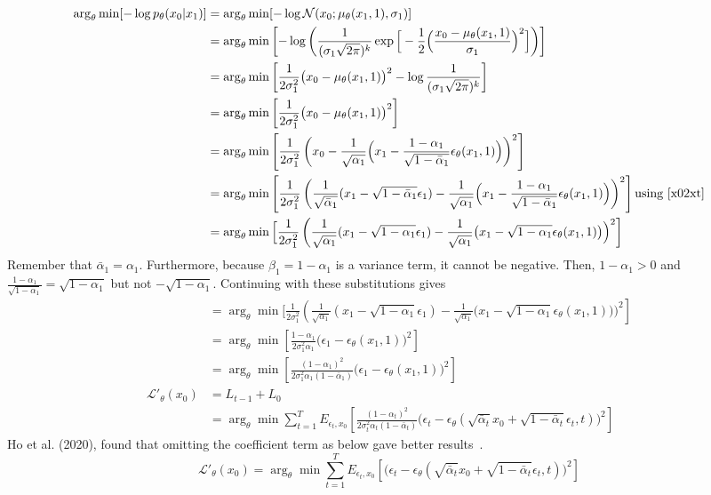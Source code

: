 \documentclass{article}
\numberwithin{equation}{subsection}
\begin{document}
\begin{align}
    \arg_\theta\min[-\log p_\theta(x_0 |x_1)] 
    &= \arg_\theta\min[-\log \mathcal{N}(x_0; \mu_\theta(x_1, 1), \sigma_1)]\\
    &= \arg_\theta\min\left[-\log \left(\frac {1}{(\sigma_1\sqrt{2\pi})^k} \exp\Big[-{\frac {1}{2}}\Big(\frac {x_0-\mu_\theta(x_1, 1)}{\sigma_1}\Big)^2\Big]\right)\right]\\
    &= \arg_\theta\min\left[{\frac {1}{2\sigma_1^2}}\big(x_0-\mu_\theta(x_1, 1)\big)^2-\log \frac {1}{(\sigma_1\sqrt{2\pi})^k}\right]\\
    &= \arg_\theta\min\left[{\frac {1}{2\sigma_1^2}}\big(x_0-\mu_\theta(x_1, 1)\big)^2\right]\\
    &= \arg_\theta\min\left[{\frac {1}{2\sigma_1^2}}\left(x_0-\frac{1}{\sqrt{\alpha_1}} \Big(x_1 - \frac{1 - \alpha_1}{\sqrt{1 - \bar{\alpha}_1}} \epsilon_\theta(x_1,1) \Big)\right)^2\right]\\
    &= \arg_\theta\min\left[{\frac {1}{2\sigma_1^2}}\left(\frac{1}{\sqrt{\bar{\alpha}_1}}(x_1 - \sqrt{1 - \bar{\alpha}_1}\epsilon_1)-\frac{1}{\sqrt{\alpha_1}} \Big(x_1 - \frac{1 - \alpha_1}{\sqrt{1 - \bar{\alpha}_1}} \epsilon_\theta(x_1,1) \Big)\right)^2\right]\text{using~\ref{x02xt}}\\
    &= \arg_\theta\min\Big[{\frac {1}{2\sigma_1^2}}\left(\frac{1}{\sqrt{\alpha_1}}(x_1 - \sqrt{1 - \alpha_1}\epsilon_1)-\frac{1}{\sqrt{\alpha_1}} \big(x_1 - \sqrt{1 - \alpha_1} \epsilon_\theta(x_1,1) \big)\Big)^2\right]
\end{align}
Remember that $\bar{\alpha}_1 = \alpha_1$. Furthermore, because $\beta_1 = 1-\alpha_1$ is a variance term, it cannot be negative. Then, $1-\alpha_1 > 0$ and $\frac{1-\alpha_1}{\sqrt{1-\alpha_1}} = \sqrt{1-\alpha_1}$ but not $-\sqrt{1-\alpha_1}$. Continuing with these substitutions gives
\begin{align}
    &= \arg_\theta\min\Big[{\frac {1}{2\sigma_1^2}}\left(\frac{1}{\sqrt{\alpha_1}}(x_1 - \sqrt{1 - \alpha_1}\epsilon_1)-\frac{1}{\sqrt{\alpha_1}} \big(x_1 - \sqrt{1 - \alpha_1} \epsilon_\theta(x_1,1) \big)\Big)^2\right]\\
    &= \arg_\theta\min\left[\frac{1-\alpha_1}{2\sigma_1^2\alpha_1}\big(\epsilon_1-\epsilon_\theta(x_1,1) \big)^2\right]\\
    &= \arg_\theta\min\left[\frac{(1-\alpha_1)^2}{2\sigma_1^2\alpha_1(1 - \bar{\alpha}_1)}\big(\epsilon_1-\epsilon_\theta(x_1,1) \big)^2\right]\\
    \mathcal{L'}_\theta(x_0) &= L_{t-1}+L_0\\
    &= \arg_\theta\min \sum_{t=1}^TE_{\epsilon_t, x_0}\left[\frac{(1-\alpha_t)^2}{2\sigma_t^2\alpha_t(1 - \bar{\alpha}_t)}\Big(\epsilon_t-\epsilon_\theta(\sqrt{\bar{\alpha}_t}x_0 + \sqrt{1 - \bar{\alpha}_t}\epsilon_t,t) \Big)^2\right]
\end{align}
Ho et al. (2020), found that omitting the coefficient term as below gave better results~\cite{ho_denoising_2020}.
\begin{equation}
    \mathcal{L'}_\theta(x_0) = \arg_\theta\min \sum_{t=1}^TE_{\epsilon_t, x_0}\left[\Big(\epsilon_t-\epsilon_\theta(\sqrt{\bar{\alpha}_t}x_0 + \sqrt{1 - \bar{\alpha}_t}\epsilon_t,t) \Big)^2\right]
\end{equation}


\end{document}
